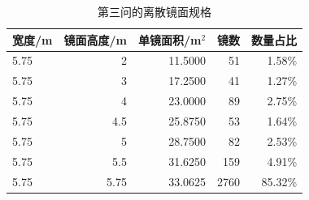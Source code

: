 \begin{table}[H]\centering\small
\caption{第三问的离散镜面规格}\label{tab:q3_sizes}
\begin{tabular}{lrrrr}\toprule
宽度/m & 镜面高度/m & 单镜面积/m$^2$ & 镜数 & 数量占比\\\midrule
5.75 & 2 & 11.5000 & 51 & 1.58\%\\
5.75 & 3 & 17.2500 & 41 & 1.27\%\\
5.75 & 4 & 23.0000 & 89 & 2.75\%\\
5.75 & 4.5 & 25.8750 & 53 & 1.64\%\\
5.75 & 5 & 28.7500 & 82 & 2.53\%\\
5.75 & 5.5 & 31.6250 & 159 & 4.91\%\\
5.75 & 5.75 & 33.0625 & 2760 & 85.32\%\\
\bottomrule\end{tabular}
\end{table}
